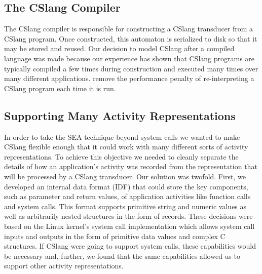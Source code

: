 \subsection{The CSlang Compiler}

The CSlang compiler is responsible for constructing a CSlang transducer
from a CSlang program.  Once constructed, this automaton is serialized to
disk so that it may be stored and reused.
Our decision to model CSlang after a compiled language was made because our
experience has shown that CSlang programs are typically
compiled a few times during construction
and executed many times over many different applications.  remove the
performance penalty of re-interpreting a CSlang program each time it is
run.


\subsection{Supporting Many Activity Representations}

In order to take the SEA technique beyond system calls we wanted to make
CSlang flexible enough that it could work with many different sorts of
activity representations.
To achieve this objective we needed to cleanly separate the details of how
an application's activity was recorded from the representation that will be
processed by a CSlang transducer.
Our solution was twofold.  First, we developed an internal data format
(IDF) that
could store the key components, such as parameter and return values,
of application activities like function
calls and system calls.  This format supports primitive string and numeric
values as well as arbitrarily nested structures in the form of records.
These decisions were based on the Linux kernel's system call implementation
which allows system call inputs and outputs in the form of primitive data
values and complex C structures.
If CSlang were going to support system calls, these capabilities would be
necessary and, further, we found that the same capabilities allowed us to
support other activity representations.


